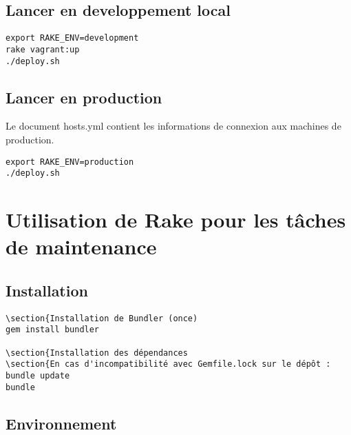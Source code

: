 \documentclass[a4paper,oneside,10pt]{article}
\begin{document}
\subsection{Lancer en developpement local}

\begin{verbatim}
export RAKE_ENV=development
rake vagrant:up
./deploy.sh
\end{verbatim}

\subsection{Lancer en production}

Le document hosts.yml contient les informations de connexion aux machines de production. 

\begin{verbatim}
export RAKE_ENV=production
./deploy.sh
\end{verbatim}


\section{Utilisation de Rake pour les tâches de maintenance}

\subsection{Installation}

\begin{verbatim}
\section{Installation de Bundler (once)
gem install bundler

\section{Installation des dépendances
\section{En cas d'incompatibilité avec Gemfile.lock sur le dépôt : bundle update
bundle
\end{verbatim}

\subsection{Environnement}
\end{document}
